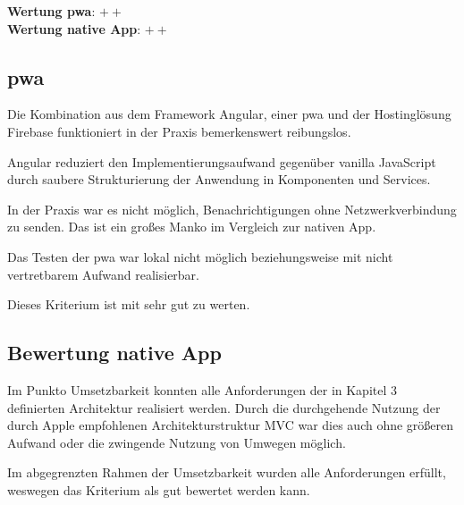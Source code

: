 \textbf{Wertung \ac{pwa}}: $++$\\
\textbf{Wertung native App}: $++$ \\

\subsection{\ac{pwa}}
Die Kombination aus dem Framework Angular, einer \ac{pwa} und der Hostinglösung Firebase funktioniert in der Praxis bemerkenswert reibungslos.

Angular reduziert den Implementierungsaufwand gegenüber vanilla JavaScript durch saubere Strukturierung der Anwendung in Komponenten und Services.

In der Praxis war es nicht möglich, Benachrichtigungen ohne Netzwerkverbindung zu senden. Das ist ein großes Manko im Vergleich zur nativen App.

Das Testen der \ac{pwa} war lokal nicht möglich beziehungsweise mit nicht vertretbarem Aufwand realisierbar.

Dieses Kriterium ist mit sehr gut zu werten.

\subsection{Bewertung native App}
Im Punkto Umsetzbarkeit konnten alle Anforderungen der in Kapitel 3 definierten Architektur realisiert werden. Durch die durchgehende Nutzung der durch Apple empfohlenen Architekturstruktur MVC war dies auch ohne größeren Aufwand oder die zwingende Nutzung von Umwegen möglich.

Im abgegrenzten Rahmen der Umsetzbarkeit wurden alle Anforderungen erfüllt, weswegen das Kriterium als gut bewertet werden kann.